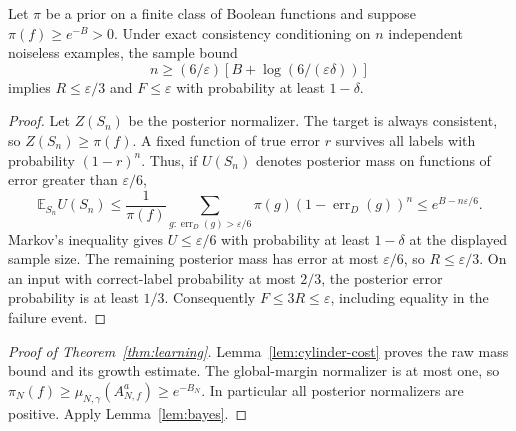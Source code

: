 \documentclass[11pt]{article}
\theoremstyle{remark}\newtheorem{remark}[theorem]{Remark}
\newcommand{\E}{\mathbb E}\newcommand{\PP}{\mathbb P}\newcommand{\R}{\mathbb R}
\begin{document}
\begin{lemma}\label{lem:bayes}
Let $\pi$ be a prior on a finite class of Boolean functions and suppose
$\pi(f)\ge e^{-B}>0$. Under exact consistency conditioning on $n$
independent noiseless examples, the sample bound
\[
 n\ge(6/\varepsilon)[B+\log(6/(\varepsilon\delta))]
\]
implies $R\le\varepsilon/3$ and $F\le\varepsilon$ with probability
at least $1-\delta$.
\end{lemma}
\begin{proof}
Let $Z(S_n)$ be the posterior normalizer. The target is always consistent,
so $Z(S_n)\ge\pi(f)$. A fixed function of true error $r$ survives all
labels with probability $(1-r)^n$. Thus, if $U(S_n)$ denotes posterior
mass on functions of error greater than $\varepsilon/6$,
\[
 \E_{S_n}U(S_n)
 \le\frac1{\pi(f)}
   \sum_{g:\operatorname{err}_D(g)>\varepsilon/6}
       \pi(g)(1-\operatorname{err}_D(g))^n
 \le e^{B-n\varepsilon/6}.
\]
Markov's inequality gives $U\le\varepsilon/6$ with probability
at least $1-\delta$ at the displayed sample size.
The remaining posterior mass has error at most $\varepsilon/6$, so
$R\le\varepsilon/3$. On an input with correct-label probability at most
$2/3$, the posterior error probability is at least $1/3$.
Consequently $F\le3R\le\varepsilon$, including equality in the failure event.
\end{proof}

\begin{proof}[Proof of Theorem~\ref{thm:learning}]
Lemma~\ref{lem:cylinder-cost} proves the raw mass bound and its growth
estimate. The global-margin normalizer is at most one, so
$\pi_N(f)\ge\mu_{N,\gamma}(A_{N,f}^a)\ge e^{-B_N}$.
In particular all posterior normalizers are positive.
Apply Lemma~\ref{lem:bayes}.
\end{proof}
\end{document}
